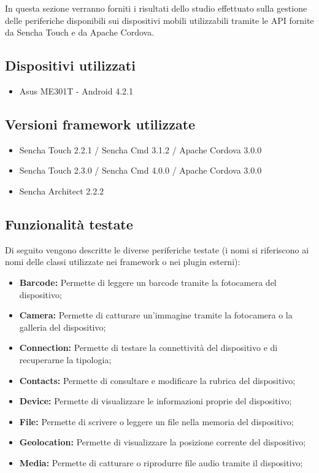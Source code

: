 In questa sezione verranno forniti i risultati dello studio effettuato sulla gestione delle periferiche disponibili sui dispositivi mobili utilizzabili tramite le API fornite da Sencha Touch e da Apache Cordova.

\subsection{Dispositivi utilizzati}
\begin{itemize}
\item Asus ME301T - Android 4.2.1
\end{itemize}

\subsection{Versioni framework utilizzate}
\begin{itemize}
\item Sencha Touch 2.2.1 / Sencha Cmd 3.1.2 / Apache Cordova 3.0.0
\item Sencha Touch 2.3.0 / Sencha Cmd 4.0.0 / Apache Cordova 3.0.0
\item Sencha Architect 2.2.2
\end{itemize}


\subsection{Funzionalità testate}
Di seguito vengono descritte le diverse periferiche testate (i nomi si riferiscono ai nomi delle classi utilizzate nei framework o nei plugin esterni):
\begin{itemize}
\item \textbf{Barcode:} Permette di leggere un barcode tramite la fotocamera del dispositivo;
\item \textbf{Camera:} Permette di catturare un'immagine tramite la fotocamera o la galleria del dispositivo;
\item \textbf{Connection:} Permette di testare la connettività del dispositivo e di recuperarne la tipologia;
\item \textbf{Contacts:} Permette di consultare e modificare la rubrica del dispositivo;
\item \textbf{Device:} Permette di visualizzare le informazioni proprie del dispositivo;
\item \textbf{File:} Permette di scrivere o leggere un file nella memoria del dispositivo;
\item \textbf{Geolocation:} Permette di visualizzare la posizione corrente del dispositivo;
\item \textbf{Media:} Permette di catturare o riprodurre file audio tramite il dispositivo;
\end{itemize}


